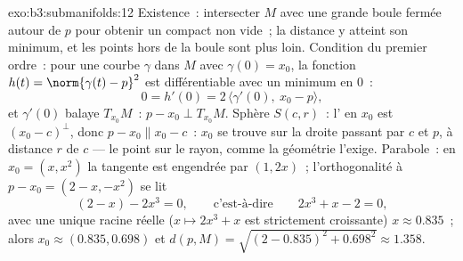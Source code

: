 \begin{solution}{exo:b3:submanifolds:12}
Existence~: intersecter $M$ avec une grande boule fermée
autour de $p$ pour obtenir un compact non vide~; la distance
 y atteint son minimum, et les points hors de la
boule sont plus loin. Condition du premier ordre~: pour une
courbe $\gamma$ dans $M$ avec $\gamma(0) = x_0$, la
fonction $h(t) = \norm{\gamma(t) - p}^2$ est différentiable
avec un minimum en $0$~:
\[
0 = h'(0) = 2\,\langle\gamma'(0),\ x_0 - p\rangle,
\]
et $\gamma'(0)$ balaye $T_{x_0}M$~: $p - x_0 \perp
T_{x_0}M$. Sphère $S(c, r)$~: l' en $x_0$ est
$(x_0 - c)^\perp$, donc $p - x_0 \parallel x_0 - c$~:
$x_0$ se trouve sur la droite passant par $c$ et $p$, à
distance $r$ de $c$ --- le point sur le rayon, comme la
géométrie l'exige. Parabole~: en $x_0 = (x, x^2)$ la
tangente est engendrée par $(1, 2x)$~; l'orthogonalité à $p
- x_0 = (2 - x, -x^2)$ se lit
\[
(2 - x) - 2x^3 = 0,
\qquad\text{c'est-à-dire}\qquad 2x^3 + x - 2 = 0,
\]
avec une unique racine réelle ($x \mapsto 2x^3 + x$ est
strictement croissante) $x \approx 0.835$~; alors $x_0
\approx (0.835, 0.698)$ et $d(p, M) = \sqrt{(2 - 0.835)^2 +
0.698^2} \approx 1.358$.
\end{solution}
